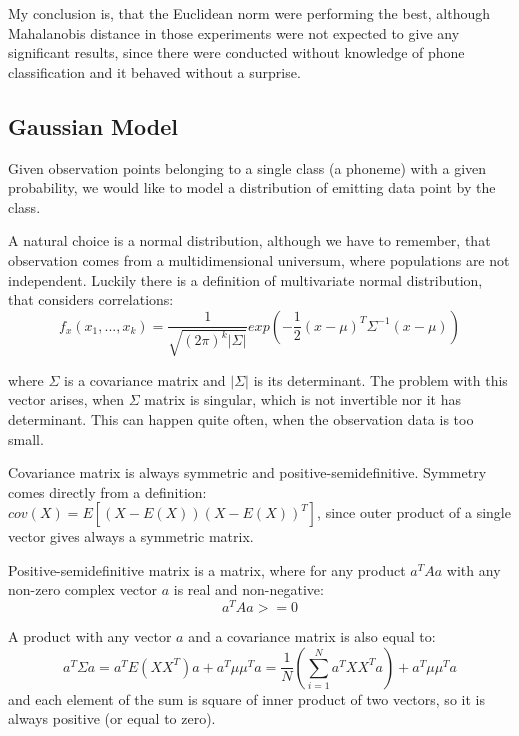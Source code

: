 \documentclass[12pt,a4paper,english]{article}
\begin{document}
My conclusion is, that the Euclidean norm were performing the best, although Mahalanobis distance in those experiments were not expected to give any significant results, since there were conducted without knowledge of phone classification and it behaved without a surprise. \newline

\newpage
\subsection{Gaussian Model}

Given observation points belonging to a single class (a phoneme) with a given probability,
we would like to model a distribution of emitting data point by the class. \newline


A natural choice is a normal distribution, although we have to remember, that observation comes from a multidimensional universum, where populations are not independent. \newline
Luckily there is a definition of multivariate normal distribution, that considers correlations:
\begin{equation}
    f_x(x_1,...,x_k) = \frac{1}{\sqrt{(2\pi)^k |{\Sigma}| }}exp(-\frac{1}{2}(x-\mu)^T{\Sigma}^{-1}(x-\mu))
\end{equation}
                       
where $\Sigma$ is a covariance matrix and $|\Sigma|$ is its determinant. \newline
The problem with this vector arises, when $\Sigma$ matrix is singular, which is not invertible nor it has determinant. This can happen quite often, when the observation data is too small. \newline

Covariance matrix is always symmetric and positive-semidefinitive.\newline
Symmetry comes directly from a definition: $cov(X) = E[(X - E(X))(X - E(X))^T]$, since outer product of a single vector gives always a symmetric matrix. \newline

Positive-semidefinitive matrix is a matrix, where for any product $a^T A a$ with any non-zero complex vector $a$ is real and non-negative:
\begin{equation}
    a^T A a >= 0
\end{equation}

A product with any vector $a$ and a covariance matrix is also equal to: 
\begin{equation}
    a^T \Sigma a = a^T E(XX^T) a + a^T\mu\mu^T a = \frac 1 N (\sum_{i=1}^N a^T X X^T a) + a^T\mu\mu^T a
\end{equation}
and each element of the sum is square of inner product of two vectors, so it is always positive (or equal to zero). \newline
\end{document}
